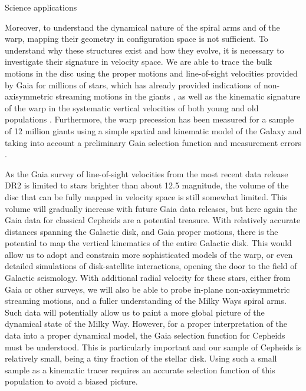 \begin{workpackage}{Science applications}
\begin{wpobjectives}
\begin{description}
{        Moreover, to understand the dynamical nature of the spiral arms and of the warp, mapping their geometry in configuration space is not sufficient. To understand why these structures exist and how they evolve, it is necessary to investigate their signature in velocity space. We are able to trace the bulk motions in the disc using the proper motions and line-of-sight velocities provided by Gaia for millions of stars, which has already provided indications of non-axisymmetric streaming motions in the giants \citep[see Fig.\ 5 in][]{Katz2018a}, as well as the kinematic signature of the warp in the systematic vertical velocities of both young and old populations \cite{Poggio2018}. Furthermore, the warp precession has been measured for a sample of 12 million giants using a simple spatial and kinematic model of the Galaxy and taking into account a preliminary Gaia selection function and measurement errors \cite{Poggio2020}. 
        
        As the Gaia survey of line-of-sight velocities from the most recent data release DR2 is limited to stars brighter than about 12.5 magnitude, the volume of the disc that can be fully mapped in velocity space is still somewhat limited. This volume will gradually increase with future Gaia data releases, but here again the Gaia data for classical Cepheids are a potential treasure. With relatively accurate distances spanning the Galactic disk, and Gaia proper motions, there is the potential to map the vertical kinematics of the entire Galactic disk. This would allow us to adopt and constrain more sophisticated models of the warp, or even detailed simulations of disk-satellite interactions, opening the door to the field of Galactic seismology. With additional radial velocity for these stars, either from Gaia or other surveys, we will also be able to probe in-plane non-axisymmetric streaming motions, and a fuller understanding of the Milky Ways spiral arms. Such data will potentially allow us to paint a more global picture of the dynamical state of the Milky Way. However, for a proper interpretation of the data into a proper dynamical model, the Gaia selection function for Cepheids must be understood. This is particularly important and our sample of Cepheids is relatively small, being a tiny fraction of the stellar disk. Using such a small sample as a kinematic tracer requires an accurate selection function of this population to avoid a biased picture. 
     
}
\end{description}
\end{wpobjectives}
\end{workpackage}
